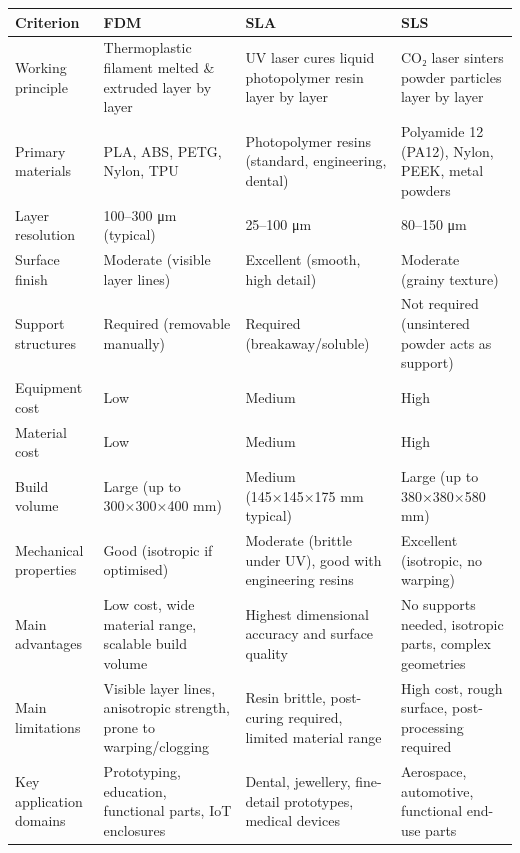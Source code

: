 
\begin{tabular}{|L{2.5cm}|L{3.5cm}|L{3.5cm}|L{3.5cm}|}
\hline
\textbf{Criterion} & \textbf{FDM} & \textbf{SLA} & \textbf{SLS} \\
\hline
Working principle & Thermoplastic filament melted \& extruded layer by layer & UV laser cures liquid photopolymer resin layer by layer & CO₂ laser sinters powder particles layer by layer \\
\hline
Primary materials & PLA, ABS, PETG, Nylon, TPU & Photopolymer resins (standard, engineering, dental) & Polyamide 12 (PA12), Nylon, PEEK, metal powders \\
\hline
Layer resolution & 100–300 μm (typical) & 25–100 μm & 80–150 μm \\
\hline
Surface finish & Moderate (visible layer lines) & Excellent (smooth, high detail) & Moderate (grainy texture) \\
\hline
Support structures & Required (removable manually) & Required (breakaway/soluble) & Not required (unsintered powder acts as support) \\
\hline
Equipment cost & Low & Medium & High \\
\hline
Material cost & Low & Medium & High \\
\hline
Build volume & Large (up to 300×300×400 mm) & Medium (145×145×175 mm typical) & Large (up to 380×380×580 mm) \\
\hline
Mechanical properties & Good (isotropic if optimised) & Moderate (brittle under UV), good with engineering resins & Excellent (isotropic, no warping) \\
\hline
Main advantages & Low cost, wide material range, scalable build volume & Highest dimensional accuracy and surface quality & No supports needed, isotropic parts, complex geometries \\
\hline
Main limitations & Visible layer lines, anisotropic strength, prone to warping/clogging & Resin brittle, post-curing required, limited material range & High cost, rough surface, post-processing required \\
\hline
Key application domains & Prototyping, education, functional parts, IoT enclosures & Dental, jewellery, fine-detail prototypes, medical devices & Aerospace, automotive, functional end-use parts \\
\hline
\end{tabular}
